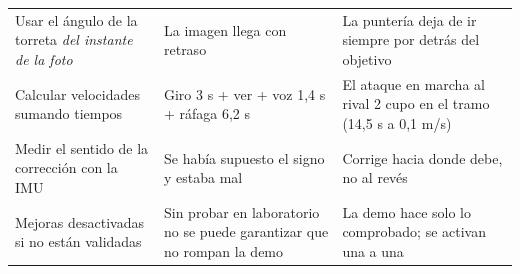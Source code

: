 \documentclass[11pt,a4paper]{article}
\begin{document}
\begin{longtable}{@{}P{3.6cm}P{5.4cm}P{5.5cm}@{}}
Usar el ángulo de la torreta \emph{del instante de la foto} & La imagen llega con retraso & La puntería deja de ir siempre por detrás del objetivo \\
Calcular velocidades sumando tiempos & Giro 3 s + ver + voz 1,4 s + ráfaga 6,2 s & El ataque en marcha al rival 2 cupo en el tramo (14,5 s a 0,1 m/s) \\
Medir el sentido de la corrección con la IMU & Se había supuesto el signo y estaba mal & Corrige hacia donde debe, no al revés \\
Mejoras desactivadas si no están validadas & Sin probar en laboratorio no se puede garantizar que no rompan la demo & La demo hace solo lo comprobado; se activan una a una \\
\bottomrule
\end{longtable}
\end{document}
